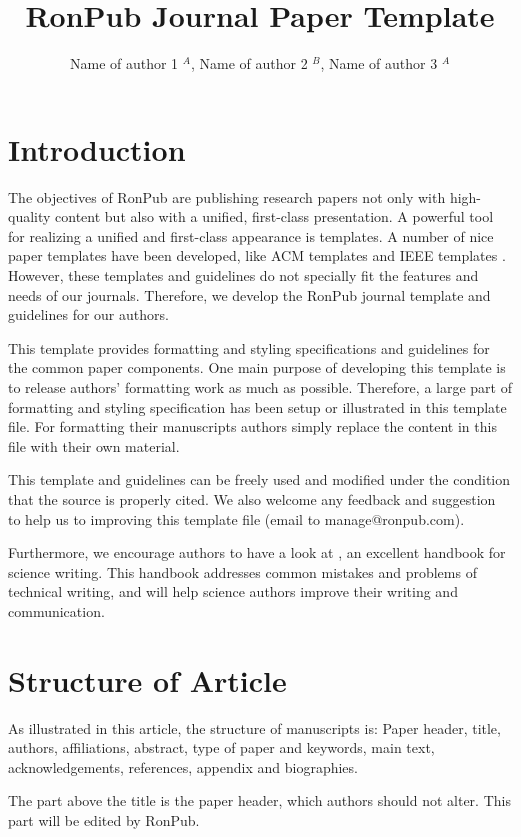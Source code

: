 \documentclass{ronpub}  %
\title{RonPub Journal Paper Template}
\author{Name of author 1 $^{A}$, Name of author 2 $^{B}$, Name of author 3 $^{A}$}
\affiliation{
$^{A}$ Institute 1, University 1, Full Address, City, Country, \{email1, email3\}@email.edu\\
$^{B}$ Institute 2, University 2, Full Address, City, Country, email2@mail.edu}
\begin{document}
\maketitle

\section{Introduction}

The objectives of RonPub are publishing research papers not only with high-quality content but also with a unified, first-class presentation. A powerful tool for realizing a unified and first-class appearance is templates. A number of nice paper templates have been developed, like ACM templates \cite{ACM13} and IEEE templates \cite{IEEE13a} \cite{IEEE13b}. However, these templates and guidelines do not specially fit the features and needs of our journals. Therefore, we develop the RonPub journal template and guidelines for our authors. 

This template provides formatting and styling specifications and guidelines for the common paper components. One main purpose of developing this template is to release authors' formatting work as much as possible. Therefore, a large part of formatting and styling specification has been setup or illustrated in this template file. For formatting their manuscripts authors simply replace the content in this file with their own material.

This template and guidelines can be freely used and modified under the condition that the source is properly cited. We also welcome any feedback and suggestion to help us to improving this template file (email to {manage@ronpub.com}).

Furthermore, we encourage authors to have a look at \cite{Y89}, an excellent handbook for science writing. This handbook addresses common mistakes and problems of technical writing, and will help science authors improve their writing and communication.

\section{Structure of Article}

As illustrated in this article, the structure of manuscripts is: Paper header, title, authors, affiliations, abstract, type of paper and keywords, main text, acknowledgements, references, appendix and biographies.

The part above the title is the paper header, which authors should not alter. This part will be edited by RonPub.
\end{document}
